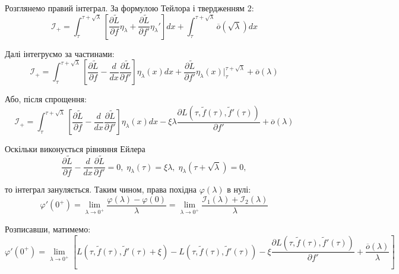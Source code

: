 \documentclass[14pt]{extarticle}
\newcommand{\<}{\langle}
\renewcommand{\>}{\rangle}
\theoremstyle{mystyle}{\newtheorem{definition}{Definition}[section]}
\theoremstyle{mystyle}{\newtheorem{proposition}[definition]{Proposition}}
\theoremstyle{mystyle}{\newtheorem{theorem}[definition]{Theorem}}
\theoremstyle{mystyle}{\newtheorem{lemma}[definition]{Lemma}}
\theoremstyle{mystyle}{\newtheorem{corollary}[definition]{Corollary}}
\theoremstyle{mystyle}{\newtheorem*{remark}{Remark}}
\theoremstyle{mystyle}{\newtheorem*{remarks}{Remarks}}
\theoremstyle{mystyle}{\newtheorem*{example}{Example}}
\theoremstyle{mystyle}{\newtheorem*{examples}{Examples}}
\theoremstyle{definition}{\newtheorem*{exercise}{Exercise}}
\theoremstyle{cstyle}{\newtheorem*{cthm}{}}
\theoremstyle{warn}
\begin{document}
Розглянемо правий інтеграл. За формулою Тейлора і твердженням 2:
\begin{equation}
    \mathcal{I}_+ = \int_{\tau}^{\tau+\sqrt{\lambda}}\left[\frac{\partial \widetilde{L}}{\partial f}\eta_{\lambda} + \frac{\partial \widetilde{L}}{\partial f'}\eta_{\lambda}'\right]dx + \int_{\tau}^{\tau+\sqrt{\lambda}}\overline{o}(\sqrt{\lambda})dx
\end{equation}

Далі інтегруємо за частинами:
\begin{equation}
    \mathcal{I}_+ = \int_{\tau}^{\tau+\sqrt{\lambda}}\left[\frac{\partial \widetilde{L}}{\partial f}-\frac{d}{dx}\frac{\partial \widetilde{L}}{\partial f'}\right]\eta_{\lambda}(x)dx + \frac{\partial \widetilde{L}}{\partial f'}\eta_{\lambda}(x)\Big|_{\tau}^{\tau+\sqrt{\lambda}}+ \overline{o}(\lambda)
\end{equation}

Або, після спрощення:
\begin{equation}
    \mathcal{I}_+ = \int_{\tau}^{\tau+\sqrt{\lambda}}\left[\frac{\partial \widetilde{L}}{\partial f}-\frac{d}{dx}\frac{\partial \widetilde{L}}{\partial f'}\right]\eta_{\lambda}(x)dx - \xi\lambda\frac{\partial L(\tau,\widetilde{f}(\tau),\widetilde{f}'(\tau))}{\partial f'} + \overline{o}(\lambda)
\end{equation}

Оскільки виконується рівняння Ейлера
\begin{equation}
    \frac{\partial \widetilde{L}}{\partial f}-\frac{d}{dx}\frac{\partial \widetilde{L}}{\partial f'} = 0, \; \eta_{\lambda}(\tau)=\xi\lambda, \; \eta_{\lambda}(\tau+\sqrt{\lambda})=0,
\end{equation}

то інтеграл зануляється. Таким чином, права похідна $\varphi(\lambda)$ в нулі:
\begin{equation}
    \varphi'(0^+)=\lim_{\lambda \to 0^+}\frac{\varphi(\lambda)-\varphi(0)}{\lambda} = \lim_{\lambda \to 0^+} \frac{\mathcal{I}_1(\lambda)+\mathcal{I}_2(\lambda)}{\lambda}
\end{equation}

Розписавши, матимемо:
\begin{equation}
    \varphi'(0^+) = \lim_{\lambda \to 0^+}\left[L(\tau,\widetilde{f}(\tau),\widetilde{f}'(\tau)+\xi)-L(\tau,\widetilde{f}(\tau),\widetilde{f}'(\tau))-\xi \frac{\partial L(\tau,\widetilde{f}(\tau),\widetilde{f}'(\tau))}{\partial f'}+\frac{\overline{o}(\lambda)}{\lambda}\right]
\end{equation}
\end{document}
